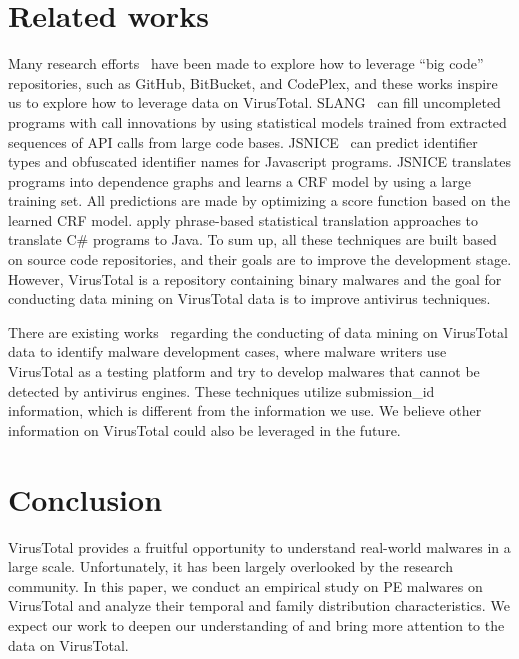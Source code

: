 \section{Related works}

Many research efforts~\cite{bigcode, big-lessons,big-translation,code-completion,big-predicting} 
have been made to explore how to leverage ``big code'' repositories, 
such as GitHub, BitBucket, and CodePlex, and these works inspire us to explore how to leverage data on VirusTotal. 
SLANG~\cite{code-completion} can fill uncompleted programs with call innovations 
by using statistical models trained from extracted sequences of API calls from large code bases.  
JSNICE~\cite{big-predicting} can predict identifier types and obfuscated identifier names for Javascript programs. 
JSNICE translates programs into dependence graphs and learns a CRF model by using a large training set. 
All predictions are made by optimizing a score function based on the learned CRF model. 
\citet{big-translation} apply phrase-based statistical translation approaches to translate C\# programs to Java.
To sum up, all these techniques are built based on source code repositories, 
and their goals are to improve the development stage. 
However, VirusTotal is a repository containing binary malwares
and the goal for conducting data mining on VirusTotal data is to improve antivirus techniques. 

There are existing works~\cite{hacker-vt,neeles} regarding the conducting of data mining on VirusTotal data to identify malware development cases, 
where malware writers use VirusTotal as a testing platform and 
try to develop malwares that cannot be detected by antivirus engines. 
These techniques utilize submission\_id information, which is different from the information we use. 
We believe other information on VirusTotal could also be leveraged in the future. 


\section{Conclusion}
VirusTotal provides a fruitful opportunity to understand real-world malwares in a large scale.
Unfortunately, it has been largely overlooked by the research community. 
In this paper, we conduct an empirical study on PE malwares on VirusTotal 
and analyze their temporal and family distribution characteristics. 
We expect our work to deepen our understanding of and bring more attention to the data on VirusTotal. 
